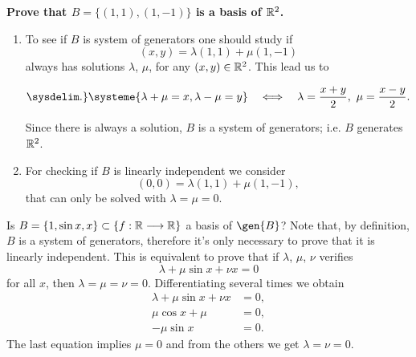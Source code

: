 \begin{example}
    \textbf{Prove that $B = \{\left( 1, 1 \right), \left( 1, -1 \right) \} $ is a basis of $\mathbb{R}^2$.}
    \begin{enumerate}
        \item To see if $B$ is system of generators one should study if
    \begin{equation}
        \left( x, y \right) = \lambda\left( 1, 1 \right) + \mu\left( 1, -1 \right)
    \end{equation}
    always has solutions $\lambda$, $\mu$, for any $\left( x, y \right) \in\mathbb{R}^2$. This lead us to

    \begin{equation}
        \sysdelim.\}\systeme{\lambda + \mu = x,\lambda - \mu = y} \quad\iff\quad \lambda = \frac{x + y}{2},\ \mu =
            \frac{x - y}{2}.
    \end{equation}

    Since there is always a solution, $B$ is a system of generators; i.e. $B$ generates $\mathbb{R}^2$. 

    \item For checking if $B$ is linearly independent we consider
    \begin{equation}
        \left( 0, 0 \right) = \lambda\left( 1, 1 \right) + \mu\left( 1, -1 \right),
    \end{equation}
    that can only be solved with $\lambda = \mu = 0$.
    \end{enumerate}
\end{example}

\begin{example}
    Is $B = \{1, \sin x, x\}\subset \{f : \mathbb{R}\longrightarrow \mathbb{R}\}$ a basis of $\gen{B}$? Note that, by definition,
    $B$ is a system of generators, therefore it's only necessary to prove that it is linearly independent.
    This is equivalent to prove that if $\lambda$, $\mu$, $\nu$ verifies
    \begin{equation}
        \lambda + \mu\sin x + \nu x = 0
    \end{equation}
    for all $x$, then $\lambda = \mu = \nu = 0$. Differentiating several times we obtain
    \begin{align}
        \lambda + \mu\sin x + \nu x &= 0, \\
        \mu\cos x + \mu &= 0, \\
        -\mu\sin x &= 0.
    \end{align}
    The last equation implies $\mu = 0$ and from the others we get $\lambda = \nu = 0$.
\end{example}

